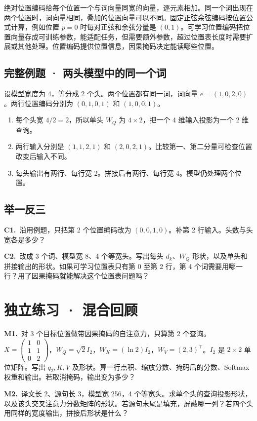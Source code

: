 \documentclass[UTF8,a4paper,11pt]{ctexart}
\newcommand{\CompactQuestion}[2]{\par\noindent\textbf{#1.}\ #2\par\vspace{.8em}}
\begin{document}
绝对位置编码给每个位置一个与词向量同宽的向量，逐元素相加。同一个词出现在两个位置时，词向量相同，叠加的位置向量可以不同。固定正弦余弦编码按位置公式计算，例如位置 $p=0$ 时每对正弦和余弦分量是 $(0,1)$。可学习位置编码把位置向量存成可训练参数，能适配任务，但需要额外参数，超过位置表长度时需要扩展或其他处理。位置编码提供位置信息，因果掩码决定能读哪些位置。

\subsection{完整例题 · 两头模型中的同一个词}
设模型宽度为 4，等分成 2 个头。两个位置都有同一词，词向量 $e=(1,0,2,0)$。两行位置编码分别为 $(0,1,0,1)$ 和 $(1,0,0,1)$。

\begin{enumerate}
\item 每个头宽 $4/2=2$，所以单头 $W_Q$ 为 $4\times2$，把一个 4 维输入投影为一个 2 维查询。
\item 两行输入分别是 $(1,1,2,1)$ 和 $(2,0,2,1)$。比较第一、第二分量可检查位置改变后输入不同。
\item 每头输出有两行、每行宽 2。拼接后有两行、每行宽 4。模型仍处理两个位置。
\end{enumerate}
\subsection{举一反三}
\CompactQuestion{C1}{沿用例题，只把第 2 个位置编码改为 $(0,0,1,0)$。补第 2 行输入。头数与头宽各是多少？}
\CompactQuestion{C2}{改成 3 个词、模型宽 8、4 个等宽头。写出每头 $d_k$、$W_Q$ 形状，以及单头和拼接输出的形状。如果可学习位置表只有第 0 至第 2 行，第 4 个词需要用哪一行？用了因果掩码就能解决这个位置表问题吗？}
\clearpage
\section{独立练习 · 混合回顾}
\CompactQuestion{M1}{对 3 个目标位置做带因果掩码的自注意力，只算第 2 个查询。$X=\begin{pmatrix}1&0\\1&1\\0&2\end{pmatrix}$，$W_Q=\sqrt{2}I_2$，$W_K=(\ln2)I_2$，$W_V=(2,3)^\top$。$I_2$ 是 $2\times2$ 单位矩阵。写出 $q_2,K,V$ 及形状。算一行点积、缩放分数、掩码后的分数、Softmax 权重和输出。若取消掩码，输出变为多少？}
\CompactQuestion{M2}{译文长 2、源句长 3，模型宽 256，4 个等宽头。求单个头的查询投影形状，以及该头交叉注意力分数矩阵的形状。若源句末尾是填充，屏蔽哪一列？若四个头用同样的宽度输出，拼接后形状是什么？}
\clearpage
\end{document}
